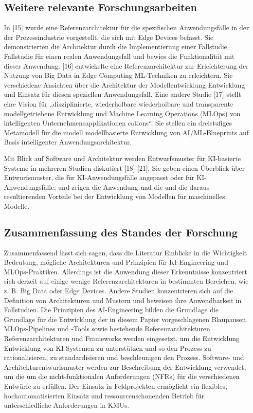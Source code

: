 \documentclass[11pt,a4paper,pointlessnumbers]{scrartcl}
\theoremstyle{break}
\numberwithin{equation}{section}
\begin{document}
\subsection{Weitere relevante Forschungsarbeiten}
In [15] wurde eine Referenzarchitektur für die spezifischen Anwendungsfälle in der
der Prozessindustrie vorgestellt, die sich mit Edge Devices befasst.
Sie demonstrierten die Architektur durch die Implementierung einer Fallstudie
Fallstudie für einen realen Anwendungsfall und bewies die Funktionalität
mit dieser Anwendung.
[16] entwickelte eine Referenzarchitektur zur Erleichterung der Nutzung
von Big Data in Edge Computing ML-Techniken zu erleichtern. Sie
verschiedene Ansichten über die Architektur der Modellentwicklung
Entwicklung und Einsatz für diesen speziellen Anwendungsfall.
Eine andere Studie [17] stellt eine Vision für „disziplinierte, wiederholbare
wiederholbare und transparente modellgetriebene Entwicklung und Machine
Learning Operations (MLOps) von intelligenten Unternehmensapplikationen
cations“. Sie stellen ein dreistufiges Metamodell für die modell
modellbasierte Entwicklung von AI/ML-Blueprints auf Basis intelligenter
Anwendungsarchitektur.

Mit Blick auf Software und Architektur werden Entwurfsmuster für
KI-basierte Systeme in mehreren Studien diskutiert [18]-[21].
Sie geben einen Überblick über Entwurfsmuster, die für KI-Anwendungsfälle angepasst oder
für KI-Anwendungsfälle, und zeigen die Anwendung und die
und die daraus resultierenden Vorteile bei der Entwicklung von Modellen für maschinelles
Modelle.

\subsection{Zusammenfassung des Standes der Forschung}
Zusammenfassend lässt sich sagen, dass die Literatur Einblicke in die Wichtigkeit
Bedeutung, mögliche Architekturen und Prinzipien für KI-Engineering
und MLOps-Praktiken. Allerdings ist die Anwendung dieser
Erkenntnisse konzentriert sich derzeit auf einige wenige Referenzarchitekturen
in bestimmten Bereichen, wie z. B. Big Data oder Edge Devices. Andere
Studien konzentrieren sich auf die Definition von Architekturen und Mustern und beweisen
ihre Anwendbarkeit in Fallstudien.
Die Prinzipien des AI-Engineering bilden die Grundlage
die Grundlage für die Entwicklung der in diesem Papier vorgeschlagenen Blaupausen.
MLOps-Pipelines und -Tools sowie bestehende Referenzarchitekturen
Referenzarchitekturen und Frameworks werden eingesetzt, um die Entwicklung
Entwicklung von KI-Systemen zu unterstützen und so den Prozess zu rationalisieren, zu standardisieren
und beschleunigen den Prozess. Software- und Architekturentwurfsmuster
werden zur Beschreibung der Entwicklung verwendet, um die
um die nicht-funktionalen Anforderungen (NFRs) für die verschiedenen
Entwürfe zu erfüllen. Der Einsatz in Feldprojekten ermöglicht ein flexibles,
hochautomatisierten Einsatz und ressourcenschonenden Betrieb
für unterschiedliche Anforderungen in KMUs.
\end{document}

